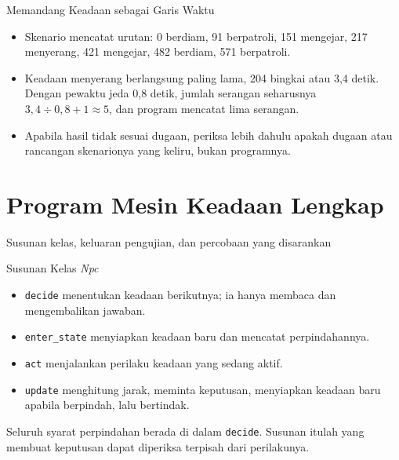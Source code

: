 \documentclass[aspectratio=169,10pt]{beamer}
\begin{document}
\begin{frame}{Memandang Keadaan sebagai Garis Waktu}
\begin{center}
\end{center}
\vspace{-0.06cm}
\begin{itemize}
  \item Skenario mencatat urutan: 0 berdiam, 91 berpatroli, 151 mengejar,
        217 menyerang, 421 mengejar, 482 berdiam, 571 berpatroli.
  \item Keadaan menyerang berlangsung paling lama, 204 bingkai atau 3,4 detik.
        Dengan pewaktu jeda 0,8 detik, jumlah serangan seharusnya
        $3{,}4 \div 0{,}8 + 1 \approx 5$, dan program mencatat lima serangan.
  \item Apabila hasil tidak sesuai dugaan, periksa lebih dahulu apakah dugaan
        atau rancangan skenarionya yang keliru, bukan programnya.
\end{itemize}
\end{frame}

\section{Program Mesin Keadaan Lengkap}
  {Susunan kelas, keluaran pengujian, dan percobaan yang disarankan}

\begin{frame}{Susunan Kelas \emph{Npc}}
\begin{itemize}
  \item \texttt{decide} menentukan keadaan berikutnya; ia hanya membaca dan
        mengembalikan jawaban.
  \item \texttt{enter\_state} menyiapkan keadaan baru dan mencatat
        perpindahannya.
  \item \texttt{act} menjalankan perilaku keadaan yang sedang aktif.
  \item \texttt{update} menghitung jarak, meminta keputusan, menyiapkan keadaan
        baru apabila berpindah, lalu bertindak.
\end{itemize}
\vspace{0.14cm}
\begin{kotak}
Seluruh syarat perpindahan berada di dalam \texttt{decide}. Susunan itulah yang
membuat keputusan dapat diperiksa terpisah dari perilakunya.
\end{kotak}
\end{frame}
\end{document}
